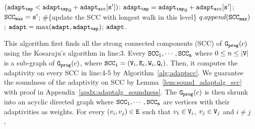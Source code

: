 \begin{algorithm}
\begin{algorithmic}[1]
    \STATE \qquad \qquad {} $(\mathtt{adapt_{tmp}} < \mathtt{adapt_{tmp}}_0 + \mathtt{adapt_{scc}[s']})$:
    \STATE \qquad \qquad \qquad \qquad $\mathtt{adapt_{tmp}} = \mathtt{adapt_{tmp}}_0 + \mathtt{adapt_{scc}[s']}$; 
    \STATE \qquad \qquad \qquad \qquad $\mathtt{SCC_{max} = s'} $; \#\{update the SCC with longest walk in this level\} 
    \STATE \qquad \qquad \qquad $q.append(\mathtt{SCC_{max}})$;
    \STATE \qquad $\mathtt{adapt} = \max(\mathtt{adapt}, \mathtt{adapt_{tmp}})$;    
    \RETURN $\mathtt{adapt}$.
    \end{algorithmic}
    \end{algorithm}
%
    This algorithm first finds all the strong connected components (SCC) of $\mathtt{{G_{prog}}}(c)$ using the Kosaraju’s algorithm in line:3.
    Every $\mathtt{SCC_1}, \cdots, \mathtt{SCC_n}$
    where $0 \leq n \leq |\mathtt{V}|$ is a sub-graph of $\mathtt{{G_{prog}}}(c)$, where $\mathtt{SCC_i} = (\mathtt{V}_i, \mathtt{E}_i, \mathtt{W}_i, \mathtt{Q}_i)$.
    Then, 
    it computes the adaptivity on every SCC
    in line:4-5 by Algorithm~\ref{alg:adaptscc}.
    We guarantee the soundness of the adaptivity on SCC by Lemma~\ref{lem:sound_adaptalg_scc} with proof in Appendix~\ref{apdx:adaptalg_soundness}.
    The $\mathtt{{G_{prog}}}(c)$ is then shrunk into an acyclic directed graph where 
    $\mathtt{SCC_1}, \cdots, \mathtt{SCC_n}$ are vertices with their adaptivities as weights.
    For every $(v_i, v_j) \in \mathtt{E}$ such that $v_1 \in \mathtt{V}_i$, $v_j \in \mathtt{V}_j$ and $i \neq j$,
